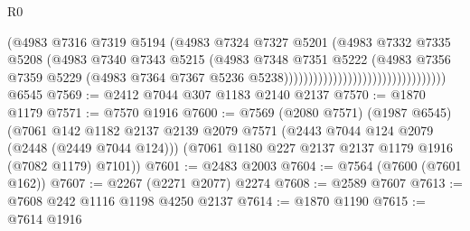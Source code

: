 \begin{lexlean}{R0}
\begin{coremodule}
                                                        (@4983
                                                          @7316
                                                          @7319
                                                          @5194
                                                          (@4983
                                                            @7324
                                                            @7327
                                                            @5201
                                                            (@4983
                                                              @7332
                                                              @7335
                                                              @5208
                                                              (@4983
                                                                @7340
                                                                @7343
                                                                @5215
                                                                (@4983
                                                                  @7348
                                                                  @7351
                                                                  @5222
                                                                  (@4983
                                                                    @7356
                                                                    @7359
                                                                    @5229
                                                                    (@4983
                                                                      @7364
                                                                      @7367
                                                                      @5236
                                                                      @5238)))))))))))))))))))))))))))))))))
    @6545
@7569 := @2412 @7044 @307 @1183 @2140 @2137
@7570 := @1870 @1179
@7571 := @7570 @1916
@7600 := @7569
    (@2080 @7571)
    (@1987 @6545)
    (@7061
      @142
      @1182
      @2137
      @2139
      @2079
      @7571
      (@2443 @7044 @124 @2079 (@2448 (@2449 @7044 @124)))
      (@7061 @1180 @227 @2137 @2137 @1179 @1916 (@7082 @1179) @7101))
@7601 := @2483 @2003
@7604 := @7564 (@7600 (@7601 @162))
@7607 := @2267 (@2271 @2077) @2274
@7608 := @2589 @7607
@7613 := @7608 @242 @1116 @1198 @4250 @2137
@7614 := @1870 @1190
@7615 := @7614 @1916

\end{coremodule}
\end{lexlean}
